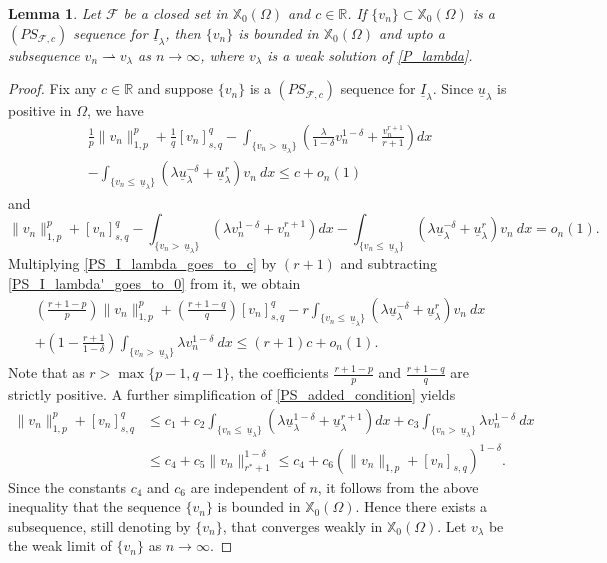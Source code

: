 \documentclass[reqno,oneside]{amsart}
\newtheorem{lemma}[theorem]{Lemma}
\theoremstyle{definition}
\theoremstyle{remark}
\numberwithin{equation}{section}
\newcommand{\Om} {\Omega}
\newcommand{\sr}{\mathbb{R}}
\newcommand{\rar}{\rightarrow}
\newcommand{\xo}{\mathbb{X}_0}
\newcommand{\ul}{\underline{u}}
\newcommand{\ti}{\underline{I}_{\la}}
\newcommand{\la} {\lambda}
\begin{document}
\begin{lemma}\label{PS_sequence_bounded}
    Let $\mathcal{F}$ be a closed set in $\xo(\Om)$ and $c\in\sr$. If $\{v_n\} \subset \xo(\Om)$ is a $(PS_{\mathcal{F}, c})$ sequence for $\ti$, then $\{v_n\}$ is bounded in $\xo(\Om)$ and upto a subsequence $v_n \rightharpoonup v_{\la}$ as $n\rar\infty$, where $v_{\la}$ is a weak solution of \eqref{P_lambda}.
\end{lemma}

\begin{proof}
    Fix any $c\in \sr$ and suppose $\{v_n\}$ is a $(PS_{\mathcal{F}, c})$ sequence for $\ti$. Since $\ul_{\la}$ is positive in $\Om$, we have
    \begin{multline}\label{PS_I_lambda_goes_to_c}
        \frac{1}{p} \|v_n\|_{1,p}^p + \frac{1}{q} [v_n]_{s,q}^q - \int_{\{v_n >\ \underline{u}_{\la}\}} \left( \frac{\la}{1-\delta} v_n^{1-\delta} + \frac{v_n^{r+1}}{r+1} \right) dx\\
        - \int_{\{v_n \leq\ \underline{u}_{\la}\}} \left( \la \ul_{\la}^{-\delta} + \ul_{\la}^r \right) v_n\ dx \leq c +o_n (1)
    \end{multline}
    and
    \begin{equation}\label{PS_I_lambda'_goes_to_0}
        \|v_n\|_{1,p}^p + [v_n]_{s,q}^q - \int_{\{v_n >\ \underline{u}_{\la}\}} \left( \la v_n^{1-\delta} + v_n^{r+1} \right) dx - \int_{\{v_n \leq\ \underline{u}_{\la}\}} \left( \la \ul_{\la}^{-\delta} + \ul_{\la}^r \right) v_n\ dx = o_n (1).
    \end{equation}
    Multiplying \eqref{PS_I_lambda_goes_to_c} by $(r+1)$ and subtracting \eqref{PS_I_lambda'_goes_to_0} from it, we obtain
    \begin{multline}\label{PS_added_condition}
        \left(\frac{r+1-p}{p}\right) \|v_n\|_{1,p}^p + \left(\frac{r+1-q}{q}\right) [v_n]_{s,q}^q - r \int_{\{v_n \leq\ \underline{u}_{\la}\}} \left( \la \ul_{\la}^{-\delta} + \ul_{\la}^r \right) v_n\ dx\\
        + \left( 1 - \frac{r+1}{1-\delta} \right) \int_{\{v_n >\ \underline{u}_{\la}\}} \la v_n^{1-\delta}\ dx \leq (r+1)c + o_n (1).
    \end{multline}
    Note that as $r > \max\{ p-1, q-1 \}$, the coefficients $\frac{r+1-p}{p}$ and $\frac{r+1-q}{q}$ are strictly positive. A further simplification of \eqref{PS_added_condition} yields
    \begin{align*}
        \|v_n\|_{1,p}^p + [v_n]_{s,q}^q &\leq c_1 + c_2 \int_{\{v_n \leq\ \underline{u}_{\la}\}} \left( \la \ul_{\la}^{1-\delta} + \ul_{\la}^{r+1} \right) dx + c_3 \int_{\{v_n >\ \underline{u}_{\la}\}} \la v_n^{1-\delta}\ dx\\[3mm]
        &\leq c_4 + c_5 \|v_n\|_{r^* +1}^{1-\delta} \leq c_4 + c_6 \left( \|v_n\|_{1,p} + [v_n]_{s,q} \right)^{1-\delta}.
    \end{align*}
    Since the constants $c_4$ and $c_6$ are independent of $n$, it follows from the above inequality that the sequence $\{v_n\}$ is bounded in $\xo(\Om)$. Hence there exists a subsequence, still denoting by $\{v_n\}$, that converges weakly in $\xo(\Om)$. Let $v_{\la}$ be the weak limit of $\{v_n\}$ as $n\rar\infty$.


\end{proof}
\end{document}
